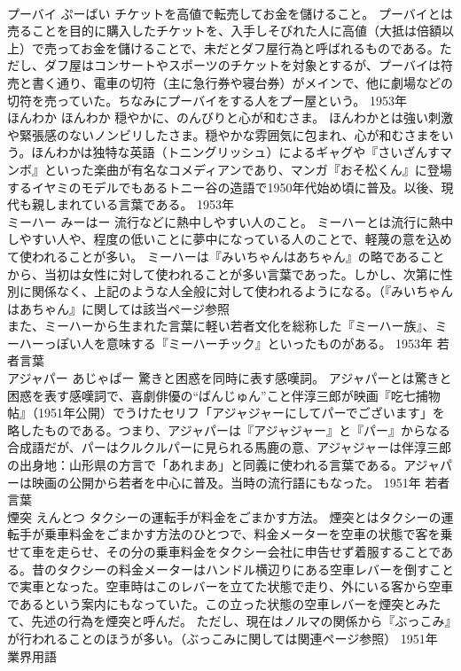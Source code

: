 \documentclass[8pt]{extreport}
\begin{document}
\begin{CJK}{UTF8}{min}
\\	プーバイ	ぷーばい	チケットを高値で転売してお金を儲けること。	プーバイとは売ることを目的に購入したチケットを、入手しそびれた人に高値（大抵は倍額以上）で売ってお金を儲けることで、未だとダフ屋行為と呼ばれるものである。ただし、ダフ屋はコンサートやスポーツのチケットを対象とするが、プーバイは符売と書く通り、電車の切符（主に急行券や寝台券）がメインで、他に劇場などの切符を売っていた。ちなみにプーバイをする人をプー屋という。	1953年	
\\	ほんわか	ほんわか	穏やかに、のんびりと心が和むさま。	ほんわかとは強い刺激や緊張感のないノンビリしたさま。穏やかな雰囲気に包まれ、心が和むさまをいう。ほんわかは独特な英語（トニングリッシュ）によるギャグや『さいざんすマンボ』といった楽曲が有名なコメディアンであり、マンガ『おそ松くん』に登場するイヤミのモデルでもあるトニー谷の造語で1950年代始め頃に普及。以後、現代も親しまれている言葉である。	1953年	
\\	ミーハー	みーはー	流行などに熱中しやすい人のこと。	ミーハーとは流行に熱中しやすい人や、程度の低いことに夢中になっている人のことで、軽蔑の意を込めて使われることが多い。 ミーハーは『みいちゃんはあちゃん』の略であることから、当初は女性に対して使われることが多い言葉であった。しかし、次第に性別に関係なく、上記のような人全般に対して使われるようになる。（『みいちゃんはあちゃん』に関しては該当ページ参照 
\\	また、ミーハーから生まれた言葉に軽い若者文化を総称した『ミーハー族』、ミーハーっぽい人を意味する『ミーハーチック』といったものがある。	1953年	若者言葉	
\\	アジャパー	あじゃぱー	驚きと困惑を同時に表す感嘆詞。	アジャパーとは驚きと困惑を表す感嘆詞で、喜劇俳優の“ばんじゅん”こと伴淳三郎が映画『吃七捕物帖』（1951年公開）でうけたセリフ「アジャジャーにしてパーでございます」を略したものである。つまり、アジャパーは『アジャジャー』と『パー』からなる合成語だが、パーはクルクルパーに見られる馬鹿の意、アジャジャーは伴淳三郎の出身地：山形県の方言で「あれまあ」と同義に使われる言葉である。アジャパーは映画の公開から若者を中心に普及。当時の流行語にもなった。	1951年	若者言葉	
\\	煙突	えんとつ	タクシーの運転手が料金をごまかす方法。	煙突とはタクシーの運転手が乗車料金をごまかす方法のひとつで、料金メーターを空車の状態で客を乗せて車を走らせ、その分の乗車料金をタクシー会社に申告せず着服することである。昔のタクシーの料金メーターはハンドル横辺りにある空車レバーを倒すことで実車となった。空車時はこのレバーを立てた状態で走り、外にいる客から空車であるという案内にもなっていた。この立った状態の空車レバーを煙突とみたて、先述の行為を煙突と呼んだ。 ただし、現在はノルマの関係から『ぶっこみ』が行われることのほうが多い。（ぶっこみに関しては関連ページ参照）	1951年	業界用語	

\end{CJK}
\end{document}
